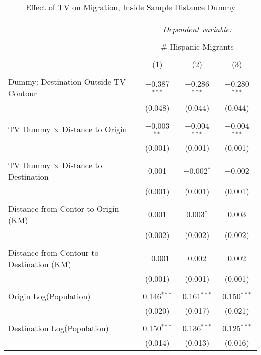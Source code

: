 
\begin{table}[!htbp] \centering 
  \caption{Effect of TV on Migration, Inside Sample Distance Dummy} 
  \label{} 
\begin{tabular}{@{\extracolsep{5pt}}lccc} 
\\[-1.8ex]\hline 
\hline \\[-1.8ex] 
 & \multicolumn{3}{c}{\textit{Dependent variable:}} \\ 
\cline{2-4} 
\\[-1.8ex] & \multicolumn{3}{c}{\# Hispanic Migrants} \\ 
\\[-1.8ex] & (1) & (2) & (3)\\ 
\hline \\[-1.8ex] 
 Dummy: Destination Outside TV Contour & $-$0.387$^{***}$ & $-$0.286$^{***}$ & $-$0.280$^{***}$ \\ 
  & (0.048) & (0.044) & (0.044) \\ 
  & & & \\ 
 TV Dummy $\times$ Distance to Origin & $-$0.003$^{**}$ & $-$0.004$^{***}$ & $-$0.004$^{***}$ \\ 
  & (0.001) & (0.001) & (0.001) \\ 
  & & & \\ 
 TV Dummy $\times$ Distance to Destination & 0.001 & $-$0.002$^{*}$ & $-$0.002 \\ 
  & (0.001) & (0.001) & (0.001) \\ 
  & & & \\ 
 Distance from Contor to Origin (KM) & 0.001 & 0.003$^{*}$ & 0.003 \\ 
  & (0.002) & (0.002) & (0.002) \\ 
  & & & \\ 
 Distance from Contour to Destination (KM) & $-$0.001 & 0.002 & 0.002 \\ 
  & (0.001) & (0.001) & (0.001) \\ 
  & & & \\ 
 Origin Log(Population) & 0.146$^{***}$ & 0.161$^{***}$ & 0.150$^{***}$ \\ 
  & (0.020) & (0.017) & (0.021) \\ 
  & & & \\ 
 Destination Log(Population) & 0.150$^{***}$ & 0.136$^{***}$ & 0.125$^{***}$ \\ 
  & (0.014) & (0.013) & (0.016) \\ 

\end{tabular}
\end{table}
